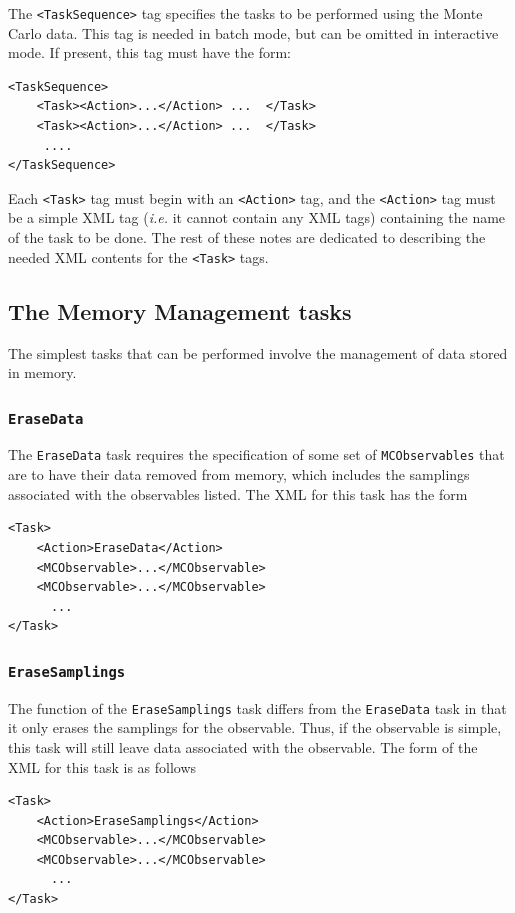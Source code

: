 \documentclass[12pt]{article}
\newcommand{\vb}{\texttt}
\begin{document}
The \vb{<TaskSequence>} tag specifies the tasks to be performed using the
Monte Carlo data.  This tag is needed in batch mode, but
can be omitted in interactive mode.  If present, this tag must have the form:
\begin{verbatim}
<TaskSequence>
    <Task><Action>...</Action> ...  </Task>
    <Task><Action>...</Action> ...  </Task>
     ....
</TaskSequence>
\end{verbatim}
Each \vb{<Task>} tag must begin with an \vb{<Action>} tag, and
the \vb{<Action>} tag must be a simple XML tag (\textit{i.e.} it cannot contain
any XML tags) containing the name of the task to be done.
The rest of these notes are dedicated to describing the needed XML contents
for the \vb{<Task>} tags.

\subsection{The Memory Management tasks}

The simplest tasks that can be performed involve the management
of data stored in memory.

\subsubsection{\vb{EraseData}}

The \vb{EraseData} task requires the specification of some set
of \vb{MCObservables} that are to have their data removed
from memory, which includes the samplings associated with
the observables listed. The XML for this task has the form
\begin{verbatim}
<Task>
    <Action>EraseData</Action>
    <MCObservable>...</MCObservable>
    <MCObservable>...</MCObservable>
      ...
</Task>
\end{verbatim}

\subsubsection{\vb{EraseSamplings}}

The function of the \vb{EraseSamplings} task differs from the
\vb{EraseData} task in that it only erases the samplings for
the observable. Thus, if the observable is simple, this task
will still leave data associated with the observable. The form
of the XML for this task is as follows
\begin{verbatim}
<Task>
    <Action>EraseSamplings</Action>
    <MCObservable>...</MCObservable>
    <MCObservable>...</MCObservable>
      ...
</Task>
\end{verbatim}
\end{document}
